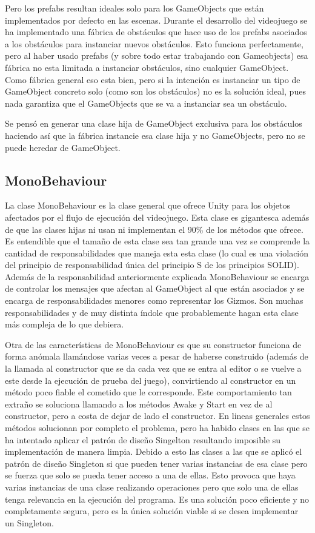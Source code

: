 Pero los prefabs resultan ideales solo para los GameObjects que están implementados por defecto en las escenas. Durante el desarrollo del videojuego se ha implementado una fábrica de obstáculos que hace uso de los prefabs asociados a los obstáculos para instanciar nuevos obstáculos. Esto funciona perfectamente, pero al haber usado prefabs (y sobre todo estar trabajando con Gameobjects) esa fábrica no esta limitada a instanciar obstáculos, sino cualquier GameObject. Como fábrica general eso esta bien, pero si la intención es instanciar un tipo de GameObject concreto solo (como son los obstáculos) no es la solución ideal, pues nada garantiza que el GameObjects que se va a instanciar sea un obstáculo.

Se pensó en generar una clase hija de GameObject exclusiva para los obstáculos haciendo así que la fábrica instancie esa clase hija y no GameObjects, pero no se puede heredar de GameObject.

\subsection{MonoBehaviour}
La clase MonoBehaviour es la clase general que ofrece Unity para los objetos afectados por el flujo de ejecución del videojuego. Esta clase es gigantesca además de que las clases hijas ni usan ni implementan el 90\% de los métodos que ofrece. Es entendible que el tamaño de esta clase sea tan grande una vez se comprende la cantidad de responsabilidades que maneja esta esta clase (lo cual es una violación del principio de responsabilidad única del principio S de los principios SOLID). Además de la responsabilidad anteriormente explicada MonoBehaviour se encarga de controlar los mensajes que afectan al GameObject al que están asociados y se encarga de responsabilidades menores como representar los Gizmos. Son muchas responsabilidades y de muy distinta índole que probablemente hagan esta clase más compleja de lo que debiera.

Otra de las características de MonoBehaviour es que su constructor funciona de forma anómala \cite{ConstructoresMonoBehaviour} llamándose varias veces a pesar de haberse construido (además de la llamada al constructor que se da cada vez que se entra al editor o se vuelve a este desde la ejecución de prueba del juego), convirtiendo al constructor en un método poco fiable el cometido que le corresponde. Este comportamiento tan extraño se soluciona llamando a los métodos Awake y Start en vez de al constructor, pero a costa de dejar de lado el constructor. En lineas generales estos métodos solucionan por completo el problema, pero ha habido clases en las que se ha intentado aplicar el patrón de diseño Singelton resultando imposible su implementación de manera limpia. Debido a esto las clases a las que se aplicó el patrón de diseño Singleton si que pueden tener varias instancias de esa clase pero se fuerza que solo se pueda tener acceso a una de ellas. Esto provoca que haya varias instancias de una clase realizando operaciones pero que solo una de ellas tenga relevancia en la ejecución del programa. Es una solución poco eficiente y no completamente segura, pero es la única solución viable si se desea implementar un Singleton.

